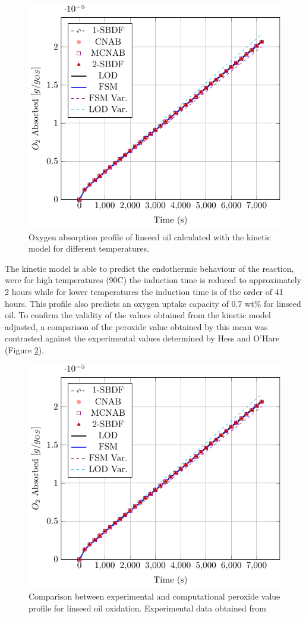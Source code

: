 \begin{refsection}
\begin{figure}[ht]
    \centering
    \includegraphics[width=0.56\linewidth,page=5]{Documento_Latex/Tesis_1/Imagenes/rozogafas.pdf}
    \caption{Oxygen absorption profile of linseed oil calculated with the kinetic model for different temperatures.}
    \label{fig:temperature_kinetics_result}
\end{figure}

The kinetic model is able to predict the endothermic behaviour of the reaction, were for high temperatures (90\degree C) the induction time is reduced to approximately 2 hours while for lower temperatures the induction time is of the order of 41 hours. This profile also predicts an  oxygen uptake capacity of 0.7 wt\% for linseed oil. To confirm the validity of the values obtained from  the kinetic model adjusted, a comparison of the peroxide value obtained by this mean was contrasted against the experimental values determined by Hess and O'Hare \cite{Hess1950OxidationOil} (Figure \ref{fig:Peroxide value}).

\begin{figure}[H]
    \centering
    \includegraphics[width=0.7\linewidth,page=6]{Documento_Latex/Tesis_1/Imagenes/rozogafas.pdf}
    \caption{Comparison between experimental and computational peroxide value profile for linseed oil oxidation. Experimental data obtained from \cite{Hess1950OxidationOil}}
    \label{fig:Peroxide value}
\end{figure}


\end{refsection}
